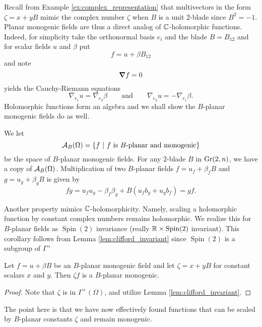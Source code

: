 
Recall from Example \ref{ex:complex_representation} that multivectors in the form $\zeta=x+yB$ mimic the complex number $\zeta$ when $B$ is a unit $2$-blade since $B^2=-1$.  Planar monogenic fields are thus a direct analog of $\mathbb{C}$-holomorphic functions.  Indeed, for simplicity take the orthonormal basis $e_i$ and the blade $B=B_{12}$ and for scalar fields $u$ and $\beta$ put
\[
f=u+\beta B_{12}
\]
and note
\[
\boldsymbol{\nabla} f = 0 
\]
yields the Cauchy-Riemann equations
\[
\nabla_{e_1} u = \nabla_{e_2} \beta \qquad \textrm{and} \qquad \nabla_{e_2}u = -\nabla_{e_1} \beta.
\]
Holomorphic functions form an algebra and we shall show the $B$-planar monogenic fields do as well. 

We let 
\[
\mathcal{A}_{B}(\Omega) = \{f ~\vert~ \textrm{$f$ is $B$-planar and monogenic}\}
\]
be the space of $B$-planar monogenic fields. For any $2$-blade $B$ in $\operatorname{Gr}(2,n)$, we have a copy of $\mathcal{A}_{B}(\Omega)$. Multiplication of two $B$-planar fields $f=u_f+\beta_f B$ and $g=u_g+\beta_g B$ is given by
\begin{equation}
\label{eq:axial_multiplication}
fg = u_f u_g - \beta_f \beta_g + B (u_f b_g + u_g b_f) = gf.
\end{equation}

Another property mimics $\mathbb{C}$-holomorphicity.  Namely, scaling a holomorphic function by constant complex numbers remains holomorphic. We realize this for $B$-planar fields as $\operatorname{Spin}(2)$ invariance (really $\mathbb{R} \times \operatorname{Spin}(2)$ invariant).  This corollary follows from Lemma \ref{lem:clifford_invariant} since $\operatorname{Spin}(2)$ is a subgroup of $\Gamma^+$ 
\begin{corollary}
    \label{cor:mult_by_i_monogenic}
    Let $f=u+\beta B$ be an $B$-planar monogenic field and let $\zeta=x+yB$ for constant scalars $x$ and $y$. Then $\zeta f$ is a $B$-planar monogenic.
\end{corollary}
\begin{proof}
    Note that $\zeta$ is in $\Gamma^+(\Omega)$, and utilize Lemma \ref{lem:clifford_invariant}.
\end{proof}
The point here is that we have now effectively found functions that can be scaled by $B$-planar constants $\zeta$ and remain monogenic. 
 
